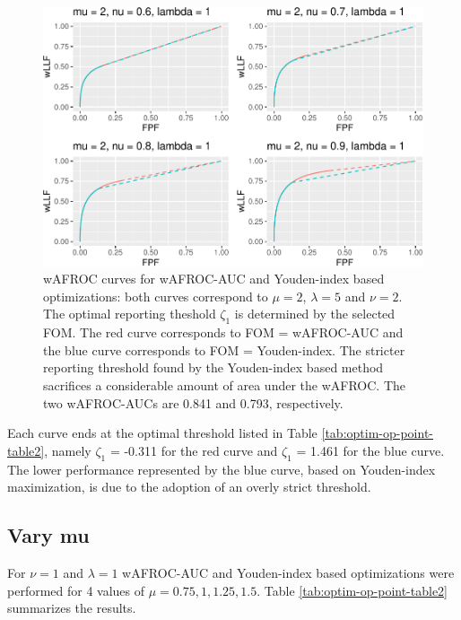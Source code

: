 \documentclass[
]{book}
\begin{document}
\begin{figure}
\centering
\includegraphics{21-optim-op-point_files/figure-latex/optim-op-point-vary-nu-wafroc-1.pdf}
\caption{\label{fig:optim-op-point-vary-nu-wafroc}wAFROC curves for wAFROC-AUC and Youden-index based optimizations: both curves correspond to \(\mu = 2\), \(\lambda = 5\) and \(\nu = 2\). The optimal reporting theshold \(\zeta_1\) is determined by the selected FOM. The red curve corresponds to FOM = wAFROC-AUC and the blue curve corresponds to FOM = Youden-index. The stricter reporting threshold found by the Youden-index based method sacrifices a considerable amount of area under the wAFROC. The two wAFROC-AUCs are 0.841 and 0.793, respectively.}
\end{figure}

Each curve ends at the optimal threshold listed in Table \ref{tab:optim-op-point-table2}, namely \(\zeta_1\) = -0.311 for the red curve and \(\zeta_1\) = 1.461 for the blue curve. The lower performance represented by the blue curve, based on Youden-index maximization, is due to the adoption of an overly strict threshold.

\hypertarget{optim-op-point-vary-mu}{%
\subsection{Vary mu}\label{optim-op-point-vary-mu}}

For \(\nu = 1\) and \(\lambda= 1\) wAFROC-AUC and Youden-index based optimizations were performed for 4 values of \(\mu = 0.75,1,1.25,1.5\). Table \ref{tab:optim-op-point-table2} summarizes the results.
\end{document}
